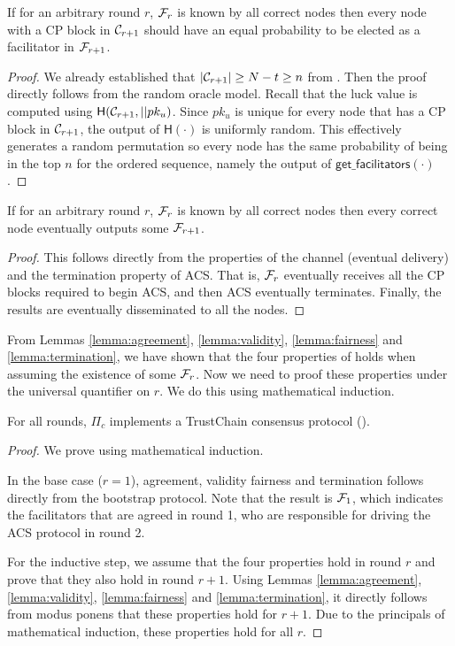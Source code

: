 \begin{lemma}
\label{lemma:fairness}
If for an arbitrary round $r$,
$\mathcal{F}_r$ is known by all correct nodes then
every node with a CP block in $\mathcal{C}_{r+1}$ should have an equal probability to be elected as a facilitator in $\mathcal{F}_{r+1}$.
\end{lemma}
\begin{proof}
We already established that $|\mathcal{C}_{r+1}| \ge N - t \ge n$ from .
Then the proof directly follows from the random oracle model.
Recall that the luck value is computed using $\textsf{H}(\mathcal{C}_{r+1}, || pk_u)$.
Since $pk_u$ is unique for every node that has a CP block in $\mathcal{C}_{r+1}$,
the output of $\textsf{H}(\cdot)$ is uniformly random.
This effectively generates a random permutation
so every node has the same probability of being in the top $n$ for the ordered sequence,
namely the output of $\textsf{get\_facilitators}(\cdot)$.
\end{proof}

\begin{lemma}
\label{lemma:termination}
If for an arbitrary round $r$,
$\mathcal{F}_r$ is known by all correct nodes then
every correct node eventually outputs some $\mathcal{F}_{r + 1}$.
\end{lemma}
\begin{proof}
This follows directly from the properties of the channel (eventual delivery)
and the termination property of ACS.
That is, $\mathcal{F}_r$ eventually receives all the CP blocks required to begin ACS,
and then ACS eventually terminates.
Finally, the results are eventually disseminated to all the nodes.
\end{proof}

From Lemmas \ref{lemma:agreement}, \ref{lemma:validity}, \ref{lemma:fairness} and \ref{lemma:termination},
we have shown that the four properties of  holds when assuming the existence of some $\mathcal{F}_r$.
Now we need to proof these properties under the universal quantifier on $r$.
We do this using mathematical induction.

\begin{theorem}
\label{theorem:consensus}
For all rounds, $\Pi_c$ implements a TrustChain consensus protocol ().
\end{theorem}
\begin{proof}
We prove using mathematical induction.

In the base case ($r = 1$), agreement, validity fairness and termination follows directly from the bootstrap protocol.
Note that the result is $\mathcal{F}_1$, which indicates the facilitators that are agreed in round 1, who are responsible for driving the ACS protocol in round 2.

For the inductive step,
we assume that the four properties hold in round $r$ and prove that they also hold in round $r + 1$.
Using Lemmas \ref{lemma:agreement}, \ref{lemma:validity}, \ref{lemma:fairness} and \ref{lemma:termination},
it directly follows from modus ponens that these properties hold for $r + 1$.
Due to the principals of mathematical induction, these properties hold for all $r$.
\end{proof}

